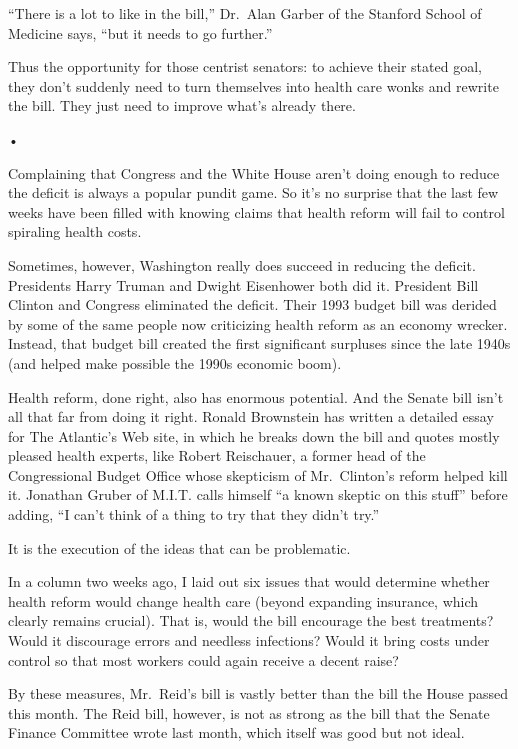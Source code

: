﻿\documentclass[12pt]{article}
\begin{document}
``There is a lot to like in the bill,'' Dr.~Alan Garber of the Stanford School of Medicine says,
``but it needs to go further.''

Thus the opportunity for those centrist senators: to achieve their stated goal, they don't suddenly
need to turn themselves into health care wonks and rewrite the bill. They just need to improve
what's already there.

•

Complaining that Congress and the White House aren't doing enough to reduce the deficit is always a
popular pundit game. So it's no surprise that the last few weeks have been filled with knowing
claims that health reform will fail to control spiraling health costs.

Sometimes, however, Washington really does succeed in reducing the deficit. Presidents Harry Truman
and Dwight Eisenhower both did it. President Bill Clinton and Congress eliminated the deficit. Their
1993 budget bill was derided by some of the same people now criticizing health reform as an economy
wrecker. Instead, that budget bill created the first significant surpluses since the late 1940s (and
helped make possible the 1990s economic boom).

Health reform, done right, also has enormous potential. And the Senate bill isn't all that far from
doing it right. Ronald Brownstein has written a detailed essay for The Atlantic's Web site, in which
he breaks down the bill and quotes mostly pleased health experts, like Robert Reischauer, a former
head of the Congressional Budget Office whose skepticism of Mr.~Clinton's reform helped kill it.
Jonathan Gruber of M.I.T. calls himself ``a known skeptic on this stuff'' before adding, ``I can't
think of a thing to try that they didn't try.''

It is the execution of the ideas that can be problematic.

In a column two weeks ago, I laid out six issues that would determine whether health reform would
change health care (beyond expanding insurance, which clearly remains crucial). That is, would the
bill encourage the best treatments? Would it discourage errors and needless infections? Would it
bring costs under control so that most workers could again receive a decent raise?

By these measures, Mr.~Reid's bill is vastly better than the bill the House passed this month. The
Reid bill, however, is not as strong as the bill that the Senate Finance Committee wrote last month,
which itself was good but not ideal.
\end{document}
